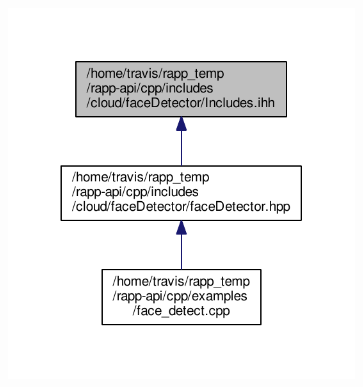 \nopagebreak
\begin{figure}[H]
\begin{center}
\leavevmode
\includegraphics[width=260pt]{cloud_2faceDetector_2Includes_8ihh__dep__incl}
\end{center}
\end{figure}
